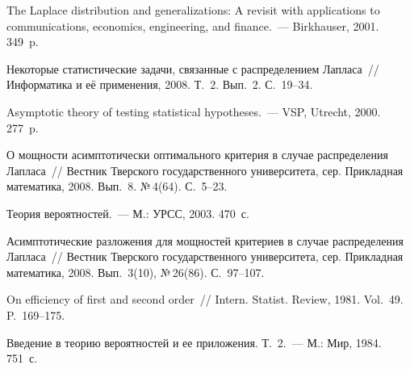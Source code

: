 \begin{multicols}{2}
{{\begin{thebibliography}{99}
The Laplace distribution and generalizations: 
A revisit with applications to communications, economics, engineering, 
and finance.~--- Birkhauser, 2001.  349~p.

Некоторые статистические  задачи, связанные с распределением Лапласа~//
Информатика и её применения, 2008. Т.~2.  Вып.~2. С.~19--34.

Asymptotic theory of testing statistical hypotheses.~--- 
VSP, Utrecht, 2000. 277~p.

О мощ\-ности асимптотически оптимального критерия в случае 
распределения Лапласа~// Вестник Тверского государственного университета, 
сер. Прикладная математика, 2008. Вып.~8. №\,4(64). С.~5--23.

Теория вероятностей.~--- М.: УРСС, 2003.  470~с.

Асимптотические 
разложения для мощностей критериев в случае распределения Лапласа~//
Вестник Тверского государственного университета, сер. 
Прикладная математика, 2008. Вып.~3(10), №\,26(86). С.~97--107.

On efficiency of first and second order~// 
Intern. Statist. Review, 1981. Vol.~49. P.~169--175.


\label{end\stat}

Введение в теорию вероятностей и ее приложения. Т.~2.~---  М.: Мир, 1984. 751~с.

 \end{thebibliography}
}
}
\end{multicols}


